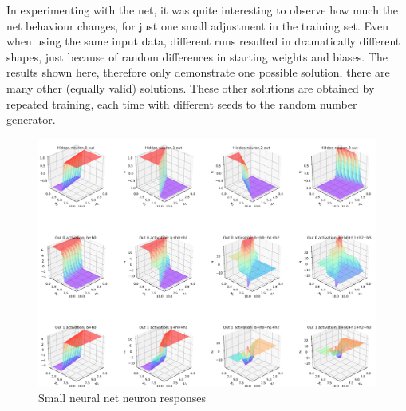 In experimenting with the net, it was quite interesting to observe how much the net behaviour changes, for just one small adjustment in the training set.  Even when using the same input data, different runs resulted in dramatically different shapes, just because of random differences in starting weights and biases.  The results shown here, therefore only demonstrate one possible solution, there are many other (equally valid) solutions.  These other solutions are obtained by repeated training, each time with different seeds to the random number generator. 
 
 
\begin{figure}[tbhp]
\centering
\includegraphics[height=1.1\textwidth,angle=90]{pic/chC-hiddeneurons}
\caption{Small neural net neuron responses\label{fig:chC-hiddeneurons}}
\end{figure}
 
